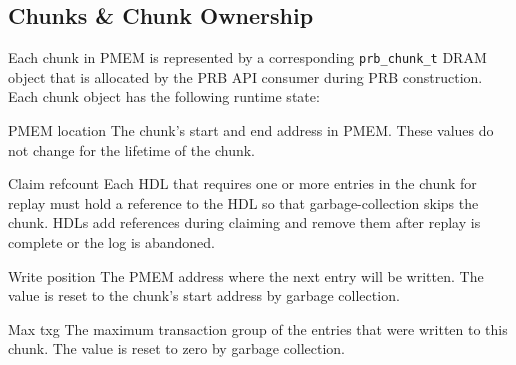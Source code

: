 \documentclass[12pt,a4paper,twoside]{book}
\begin{document}
\subsection{Chunks \& Chunk Ownership}\label{prb:di:chunkownership}

Each chunk in PMEM is represented by a corresponding \lstinline{prb_chunk_t} DRAM object that is allocated by the PRB API consumer during PRB construction.
Each chunk object has the following runtime state:
\begin{description}[noitemsep]
    \item[PMEM location] The chunk's start and end address in PMEM. These values do not change for the lifetime of the chunk.
    \item[Claim refcount] Each HDL that requires one or more entries in the chunk for replay must hold a reference to the HDL so that garbage-collection skips the chunk.
        HDLs add references during claiming and remove them after replay is complete or the log is abandoned.
    \item[Write position] The PMEM address where the next entry will be written. The value is reset to the chunk's start address by garbage collection.
    \item[Max txg] The maximum transaction group of the entries that were written to this chunk. The value is reset to zero by garbage collection.
\end{description}
\end{document}
